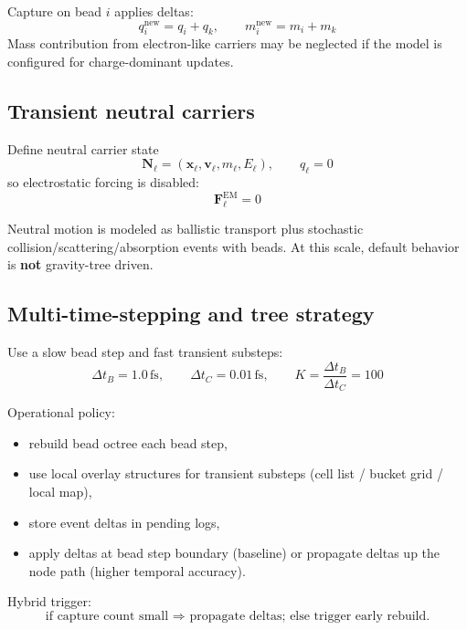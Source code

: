 \documentclass[11pt, a4paper, oneside]{article}
\begin{document}
Capture on bead $i$ applies deltas:
\begin{equation}
q_i^{\mathrm{new}}=q_i+q_k,
\qquad
m_i^{\mathrm{new}}=m_i+m_k
\end{equation}
Mass contribution from electron-like carriers may be neglected if
the model is configured for charge-dominant updates.

\subsection{Transient neutral carriers}

Define neutral carrier state
\begin{equation}
\mathbf{N}_\ell=(\mathbf{x}_\ell,\mathbf{v}_\ell,m_\ell,E_\ell),
\qquad q_\ell=0
\end{equation}
so electrostatic forcing is disabled:
\begin{equation}
\mathbf{F}^{\mathrm{EM}}_\ell=0
\end{equation}

Neutral motion is modeled as ballistic transport plus stochastic
collision/scattering/absorption events with beads.
At this scale, default behavior is \textbf{not} gravity-tree driven.

\subsection{Multi-time-stepping and tree strategy}

Use a slow bead step and fast transient substeps:
\begin{equation}
\Delta t_B=1.0\,\mathrm{fs},
\qquad
\Delta t_C=0.01\,\mathrm{fs},
\qquad
K=\frac{\Delta t_B}{\Delta t_C}=100
\end{equation}

Operational policy:
\begin{itemize}
  \item rebuild bead octree each bead step,
  \item use local overlay structures for transient substeps
	(cell list / bucket grid / local map),
  \item store event deltas in pending logs,
  \item apply deltas at bead step boundary (baseline) or
	propagate deltas up the node path (higher temporal accuracy).
\end{itemize}

Hybrid trigger:
\begin{equation}
\text{if capture count small }\Rightarrow\text{ propagate deltas;
else trigger early rebuild.}
\end{equation}
\end{document}
